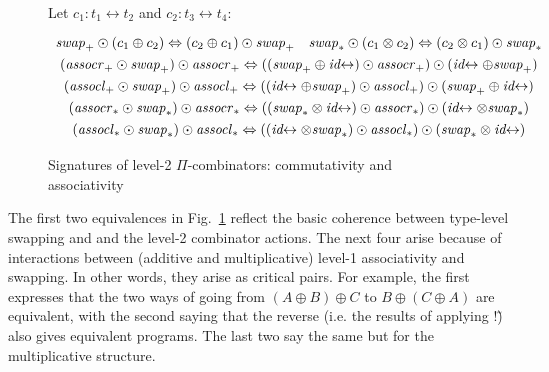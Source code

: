 \documentclass{article}
\newcommand{\swapp}{\mathit{swap}_+}
\newcommand{\assoclp}{\mathit{assocl}_+}
\newcommand{\assocrp}{\mathit{assocr}_+}
\newcommand{\swapt}{\mathit{swap}_*}
\newcommand{\assoclt}{\mathit{assocl}_*}
\newcommand{\assocrt}{\mathit{assocr}_*}
\newcommand{\idc}{\mathit{id}\!\!\leftrightarrow}
\begin{document}
\begin{figure}[tb]
Let $c_1 : t_1 \leftrightarrow t_2$ and $c_2 : t_3 \leftrightarrow t_4$:
\[\def\arraystretch{1.3}
\begin{array}{c}
  {\swapp \odot (c_1 \oplus c_2) \Leftrightarrow (c_2 \oplus c_1) \odot \swapp}
\quad
  {\swapt \odot (c_1 \otimes c_2) \Leftrightarrow (c_2 \otimes c_1) \odot \swapt}
\\
  {(\assocrp \odot \swapp) \odot \assocrp \Leftrightarrow ((\swapp \oplus \idc) \odot \assocrp) \odot (\idc \oplus \swapp)}
\\
  {(\assoclp \odot \swapp) \odot \assoclp \Leftrightarrow ((\idc \oplus \swapp) \odot \assoclp) \odot (\swapp \oplus \idc)}
\\
  {(\assocrt \odot \swapt) \odot \assocrt \Leftrightarrow ((\swapt \otimes \idc) \odot \assocrt) \odot (\idc \otimes \swapt)}
\\
  {(\assoclt \odot \swapt) \odot \assoclt \Leftrightarrow ((\idc \otimes \swapt) \odot \assoclt) \odot (\swapt \otimes \idc)}
\end{array}\]
\caption{\label{figf}Signatures of level-2 $\Pi$-combinators: commutativity and associativity}
\end{figure}

The first two equivalences in Fig.~\ref{figf} reflect the basic
coherence between type-level swapping and and the level-2 combinator
actions. The next four arise because of interactions between
(additive and multiplicative) level-1 associativity and swapping.
In other words, they arise as critical pairs.  For example,
the first expresses that the two ways of going from
$\left(A \oplus B\right) \oplus C$ to $B \oplus \left(C \oplus A\right)$
are equivalent, with the second saying that the reverse (i.e.
the results of applying $!$\~) also gives equivalent programs.
The last two say the same but for the multiplicative structure.

\begin{center}
\begin{tikzpicture}[scale=0.7,every node/.style={scale=0.8}]
\end{tikzpicture}
\end{center}
\end{document}
